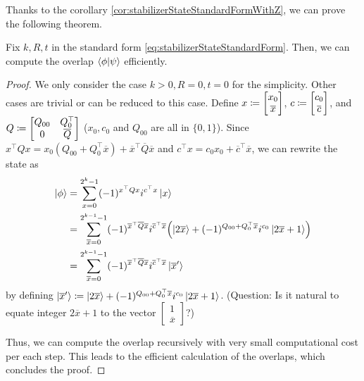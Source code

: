 \documentclass[\main/main]{subfiles}
\begin{document}
Thanks to the corollary \ref{cor:stabilizerStateStandardFormWithZ},
we can prove the following theorem.
\begin{theorem}
  Fix $k,R,t$ in the standard form \eqref{eq:stabilizerStateStandardForm}.
  Then, we can compute the overlap $\braket{\phi}{\psi}$ efficiently.
\end{theorem}
\begin{proof}
  We only consider the case $k>0,R=0,t=0$ for the simplicity.
  Other cases are trivial or can be reduced to this case.
  Define $x \coloneqq \begin{bmatrix}
      x_0 \\
      \overline{x}
    \end{bmatrix}$,
  $c \coloneqq \begin{bmatrix}
      c_0 \\
      \overline{c}
    \end{bmatrix}$, and
  $Q \coloneqq \begin{bmatrix}
      Q_{00} & Q_{0}^\top   \\
      0      & \overline{Q}
    \end{bmatrix}$
  ($x_0,c_0$ and $Q_{00}$ are all in $\{0,1\}$).
  Since
  $x^\top Q x = x_0 (Q_{00}+Q_0^\top \overline{x}) + \overline{x}^\top \overline{Q} \overline{x}$
  and
  $c^\top x = c_0 x_0 + \overline{c}^\top \overline{x}$,
  we can rewrite the state as
  \begin{align*}
    \ket{\phi} & = \sum_{x=0}^{2^k-1} (-1)^{x^\top Q x} i^{c^\top x} \ket{x}                                                                                   \\
               & = \sum_{\overline{x}=0}^{2^{k-1}-1} (-1)^{\overline{x}^\top \overline{Q} \overline{x}} i^{\overline{c}^\top \overline{x}}
    \qty(\ket{2\overline{x}} + (-1)^{Q_{00}+Q_0^\top \overline{x}} i^{c_0} \ket{2\overline{x}+1})                                                              \\
               & = \sum_{\overline{x}=0}^{2^{k-1}-1} (-1)^{\overline{x}^\top \overline{Q} \overline{x}} i^{\overline{c}^\top \overline{x}} \ket{\overline{x}'}
  \end{align*}
  by defining $\ket{\overline{x}'} \coloneqq \ket{2\overline{x}} + (-1)^{Q_{00}+Q_0^\top \overline{x}} i^{c_0} \ket{2\overline{x}+1}$.
  (Question: Is it natural to equate integer $2\overline{x}+1$ to the vector $\begin{bmatrix} 1 \\ \overline{x} \end{bmatrix}$?)

  Thus, we can compute the overlap recursively
  with very small computational cost per each step.
  This leads to the efficient calculation of the overlaps,
  which concludes the proof.
\end{proof}
\end{document}
